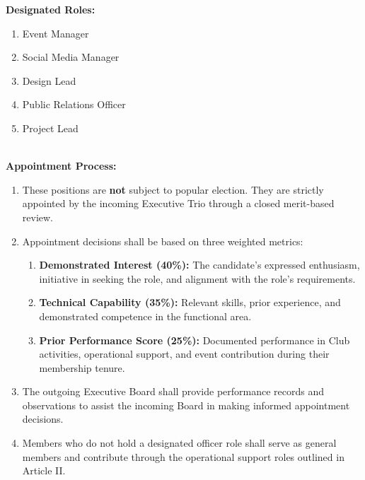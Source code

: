 \textbf{Designated Roles:}
\begin{enumerate}[label=\arabic*. , leftmargin=2em, itemsep=0.3em]
    \item Event Manager
    \item Social Media Manager
    \item Design Lead
    \item Public Relations Officer
    \item Project Lead
\end{enumerate}
\\
\textbf{Appointment Process:}
\begin{enumerate}[label=\alph*), leftmargin=2em, itemsep=0.3em]
    \item These positions are \textbf{not} subject to popular election. They are strictly appointed by the incoming Executive Trio through a closed merit-based review.
    \item Appointment decisions shall be based on three weighted metrics:
    \begin{enumerate}[label=\arabic*. , leftmargin=2em, itemsep=0.2em]
        \item \textbf{Demonstrated Interest (40\%):} The candidate's expressed enthusiasm, initiative in seeking the role, and alignment with the role's requirements.
        \item \textbf{Technical Capability (35\%):} Relevant skills, prior experience, and demonstrated competence in the functional area.
        \item \textbf{Prior Performance Score (25\%):} Documented performance in Club activities, operational support, and event contribution during their membership tenure.
    \end{enumerate}
    \item The outgoing Executive Board shall provide performance records and observations to assist the incoming Board in making informed appointment decisions.
    \item Members who do not hold a designated officer role shall serve as general members and contribute through the operational support roles outlined in Article II.
\end{enumerate}


